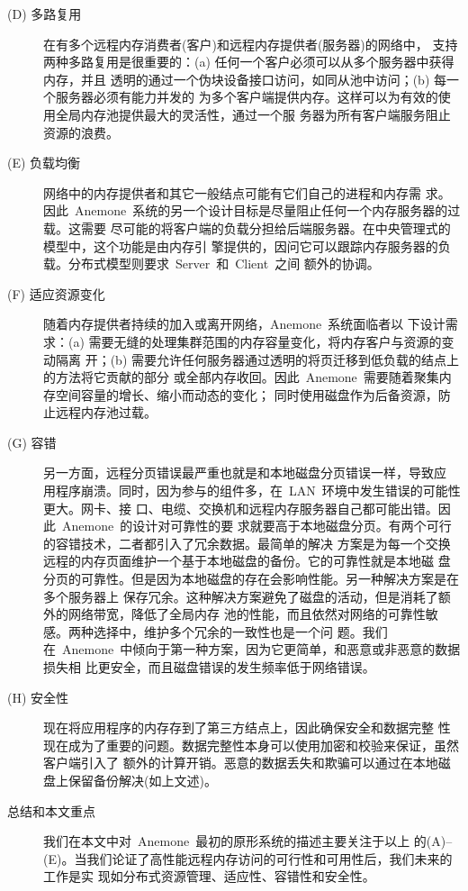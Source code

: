 \documentclass[dvipdfm, NoBUAAtitle]{BUAApaper}
\begin{document}
\begin{description}
\item[(D) 多路复用] 在有多个远程内存消费者(客户)和远程内存提供者(服务器)的网络中，
支持两种多路复用是很重要的：(a) 任何一个客户必须可以从多个服务器中获得内存，并且
透明的通过一个伪块设备接口访问，如同从池中访问；(b) 每一个服务器必须有能力并发的
为多个客户端提供内存。这样可以为有效的使用全局内存池提供最大的灵活性，通过一个服
务器为所有客户端服务阻止资源的浪费。

\item[(E) 负载均衡] 网络中的内存提供者和其它一般结点可能有它们自己的进程和内存需
求。因此~Anemone~系统的另一个设计目标是尽量阻止任何一个内存服务器的过载。这需要
尽可能的将客户端的负载分担给后端服务器。在中央管理式的模型中，这个功能是由内存引
擎提供的，因问它可以跟踪内存服务器的负载。分布式模型则要求~Server~和~Client~之间
额外的协调。

\item[(F) 适应资源变化] 随着内存提供者持续的加入或离开网络，Anemone~系统面临者以
下设计需求：(a) 需要无缝的处理集群范围的内存容量变化，将内存客户与资源的变动隔离
开；(b) 需要允许任何服务器通过透明的将页迁移到低负载的结点上的方法将它贡献的部分
或全部内存收回。因此~Anemone~需要随着聚集内存空间容量的增长、缩小而动态的变化；
同时使用磁盘作为后备资源，防止远程内存池过载。

\item[(G) 容错] 另一方面，远程分页错误最严重也就是和本地磁盘分页错误一样，导致应
用程序崩溃。同时，因为参与的组件多，在~LAN~环境中发生错误的可能性更大。网卡、接
口、电缆、交换机和远程内存服务器自己都可能出错。因此~Anemone~的设计对可靠性的要
求就要高于本地磁盘分页。有两个可行的容错技术，二者都引入了冗余数据。最简单的解决
方案是为每一个交换远程的内存页面维护一个基于本地磁盘的备份。它的可靠性就是本地磁
盘分页的可靠性。但是因为本地磁盘的存在会影响性能。另一种解决方案是在多个服务器上
保存冗余。这种解决方案避免了磁盘的活动，但是消耗了额外的网络带宽，降低了全局内存
池的性能，而且依然对网络的可靠性敏感。两种选择中，维护多个冗余的一致性也是一个问
题。我们在~Anemone~中倾向于第一种方案，因为它更简单，和恶意或非恶意的数据损失相
比更安全，而且磁盘错误的发生频率低于网络错误。

\item[(H) 安全性] 现在将应用程序的内存存到了第三方结点上，因此确保安全和数据完整
性现在成为了重要的问题。数据完整性本身可以使用加密和校验来保证，虽然客户端引入了
额外的计算开销。恶意的数据丢失和欺骗可以通过在本地磁盘上保留备份解决(如上文述)。

\item[总结和本文重点] 我们在本文中对~Anemone~最初的原形系统的描述主要关注于以上
的(A)--(E)。当我们论证了高性能远程内存访问的可行性和可用性后，我们未来的工作是实
现如分布式资源管理、适应性、容错性和安全性。

\end{description}
\end{document}
